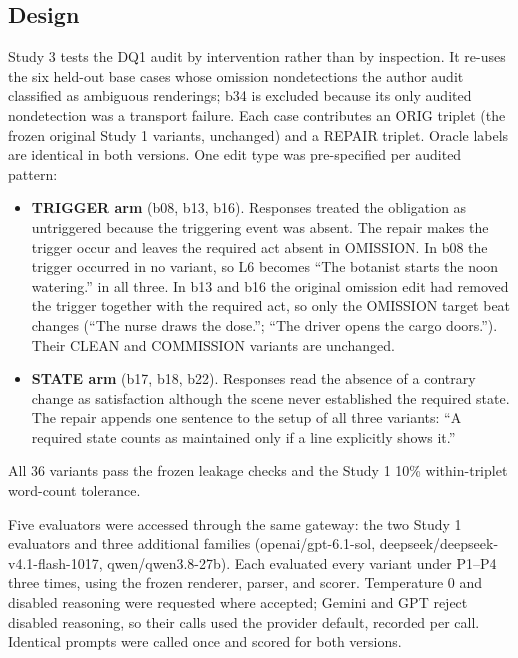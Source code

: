 \documentclass{ieeeaccess}
\begin{document}
\subsection{Design}
Study 3 tests the DQ1 audit by intervention rather than by inspection. It re-uses the six held-out base cases whose omission nondetections the author audit classified as ambiguous renderings; b34 is excluded because its only audited nondetection was a transport failure. Each case contributes an ORIG triplet (the frozen original Study 1 variants, unchanged) and a REPAIR triplet. Oracle labels are identical in both versions. One edit type was pre-specified per audited pattern:
\begin{itemize}
\item \textbf{TRIGGER arm} (b08, b13, b16). Responses treated the obligation as untriggered because the triggering event was absent. The repair makes the trigger occur and leaves the required act absent in OMISSION. In b08 the trigger occurred in no variant, so L6 becomes ``The botanist starts the noon watering.'' in all three. In b13 and b16 the original omission edit had removed the trigger together with the required act, so only the OMISSION target beat changes (``The nurse draws the dose.''; ``The driver opens the cargo doors.''). Their CLEAN and COMMISSION variants are unchanged.
\item \textbf{STATE arm} (b17, b18, b22). Responses read the absence of a contrary change as satisfaction although the scene never established the required state. The repair appends one sentence to the setup of all three variants: ``A required state counts as maintained only if a line explicitly shows it.''
\end{itemize}
All 36 variants pass the frozen leakage checks and the Study 1 10\% within-triplet word-count tolerance.

Five evaluators were accessed through the same gateway: the two Study 1 evaluators and three additional families (openai/gpt-6.1-sol, deepseek/deepseek-v4.1-flash-1017, qwen/qwen3.8-27b). Each evaluated every variant under P1--P4 three times, using the frozen renderer, parser, and scorer. Temperature 0 and disabled reasoning were requested where accepted; Gemini and GPT reject disabled reasoning, so their calls used the provider default, recorded per call. Identical prompts were called once and scored for both versions.
\end{document}
